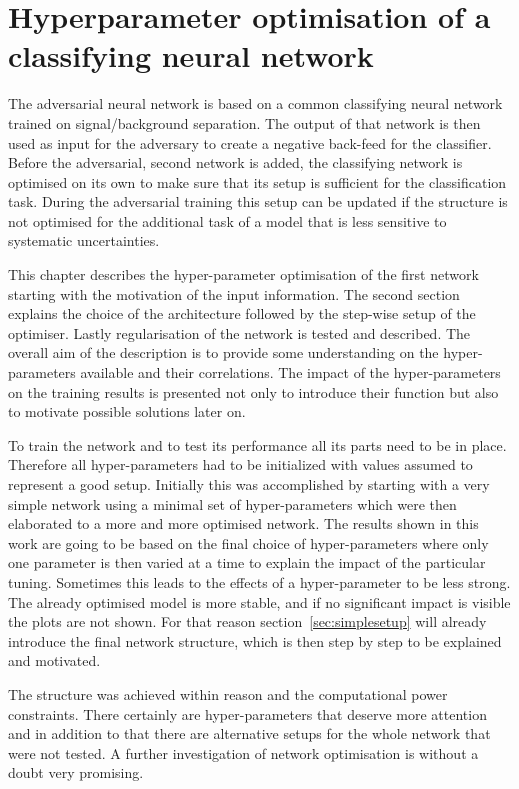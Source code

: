\chapter{Hyperparameter optimisation of a classifying neural network}
\label{chp:simpleNN}

The adversarial neural network is based on a common classifying neural network trained on signal/background separation. The output of that network is then used as input for the adversary to create a negative back-feed for the classifier.
Before the adversarial, second network is added, the classifying network is optimised on its own to make sure that its setup is sufficient for the classification task.
During the adversarial training this setup can be updated if the structure is not optimised for the additional task of a model that is less sensitive to systematic uncertainties.

This chapter describes the hyper-parameter optimisation of the first network starting with the motivation of the input information.
The second section explains the choice of the architecture followed by the step-wise setup of the optimiser.
Lastly regularisation of the network is tested and described.
The overall aim of the description is to provide some understanding on the hyper-parameters available and their correlations. The impact of the hyper-parameters on the training results is presented not only to introduce their function but also to motivate possible solutions later on.

To train the network and to test its performance all its parts need to be in place. Therefore all hyper-parameters had to be initialized with values assumed to represent a good setup. Initially this was accomplished by starting with a very simple network using a minimal set of hyper-parameters which were then elaborated to a more and more optimised network. The results shown in this work are going to be based on the final choice of hyper-parameters where only one parameter is then varied at a time to explain the impact of the particular tuning. Sometimes this leads to the effects of a hyper-parameter to be less strong. The already optimised model is more stable, and if no significant impact is visible the plots are not shown. For that reason section~\ref{sec:simplesetup} will already introduce the final network structure, which is then step by step to be explained and motivated.

The structure was achieved within reason and the computational power constraints. There certainly are hyper-parameters that deserve more attention and in addition to that there are alternative setups for the whole network that were not tested. A further investigation of network optimisation is without a doubt very promising.


